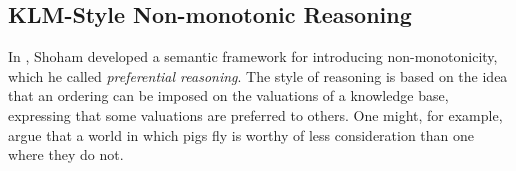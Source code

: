 

\subsection{KLM-Style Non-monotonic Reasoning}
\label{subsection: non-monotonic reasoning}

In \cite{shoham1987nonmonotonic,shoham1987reasoning}, Shoham developed a semantic framework for introducing non-monotonicity, which he called \textit{preferential reasoning}. The style of reasoning is based on the idea that an ordering can be imposed on the valuations of a knowledge base, expressing that some valuations are preferred to others. One might, for example, argue that a world in which pigs fly is worthy of less consideration than one where they do not.

